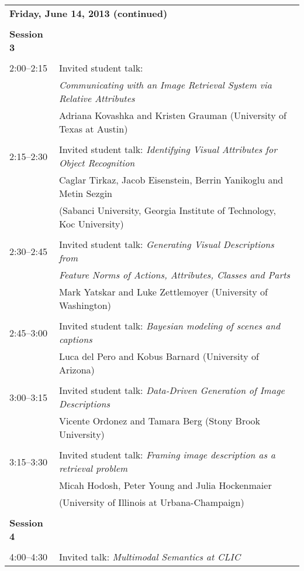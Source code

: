 \newpage
\begin{tabular}{p{20mm}p{138mm}}
\\
\multicolumn{2}{l}{\bf Friday, June 14, 2013 (continued)} \\\\
{\bf Session 3 } \\
\\
2:00--2:15 & Invited student talk:\\
& {\em Communicating with an Image Retrieval System via Relative Attributes}\\
&  Adriana Kovashka and Kristen Grauman (University of Texas at Austin) \\
\\
2:15--2:30 & Invited student talk: {\em Identifying Visual Attributes for Object Recognition}\\
& Caglar Tirkaz, Jacob Eisenstein, Berrin Yanikoglu and Metin Sezgin \\
& (Sabanci University, Georgia Institute of Technology, Koc University)\\
\\
2:30--2:45 & Invited student talk: {\em Generating Visual Descriptions from}\\
&  {\em Feature Norms of Actions, Attributes, Classes and Parts}\\
&  Mark Yatskar and Luke Zettlemoyer (University of Washington)\\
\\
2:45--3:00 & Invited student talk: {\em Bayesian modeling of scenes and captions}\\
 & Luca del Pero and Kobus Barnard (University of Arizona) \\
\\
3:00--3:15 & Invited student talk: {\em Data-Driven Generation of Image Descriptions}\\ 
&Vicente Ordonez and Tamara Berg (Stony Brook University) \\
\\
3:15--3:30 & Invited student talk: {\em Framing image description as a retrieval problem}\\
& Micah Hodosh, Peter Young and Julia Hockenmaier\\
& (University of Illinois at Urbana-Champaign) \\
\\
{\bf Session 4} \\
\\
4:00--4:30 & Invited talk: {\em Multimodal Semantics at CLIC}\\

\end{tabular}
